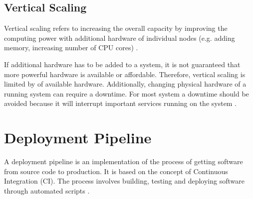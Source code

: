 \subsection{Vertical Scaling}
\label{subsec:02_foundations_scalability_vertical-scaling}
Vertical scaling refers to increasing the overall capacity by improving the computing power with additional hardware of individual nodes (e.g. adding memory, increasing number of CPU cores) \cite{Wilder2012CloudPatterns}.


If additional hardware has to be added to a system, it is not guaranteed that more powerful hardware is available or affordable.
Therefore, vertical scaling is limited by of available hardware.
Additionally, changing physical hardware of a running system can require a downtime. For most system a downtime should be avoided because it will interrupt important services running on the system \cite{Wilder2012CloudPatterns}.


\section{Deployment Pipeline}
\label{sec:02_depl-pipeline}
A deployment pipeline is an implementation of the process of getting software from source code to production.
It is based on the concept of Continuous Integration (CI).
The process involves building, testing and deploying software through automated scripts \cite{Farley2010CI}.


